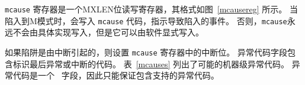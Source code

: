 \iffalse
The {\tt mcause} register is an MXLEN-bit read-write register formatted as
shown in Figure~\ref{mcausereg}.  When a trap is taken into M-mode, {\tt
mcause} is written with a code indicating the event that caused the trap.
Otherwise, {\tt mcause} is never written by the implementation, though it may be
explicitly written by software.

The Interrupt bit in the {\tt mcause} register is set if the
trap was caused by an interrupt. The Exception Code field
 contains a code identifying the last exception or interrupt.  Table~\ref{mcauses}
lists the possible machine-level exception codes.  The Exception Code
is a \wlrl\ field, so is only guaranteed to hold supported exception
codes.
\fi

{\tt mcause} 寄存器是一个MXLEN位读写寄存器，其格式如图~\ref{mcausereg} 所示。 
当陷入到M模式时，会写入 {\tt mcause} 代码，指示导致陷入的事件。 
否则，{\tt mcause}永远不会由具体实现写入，但是它可以由软件显式写入。

如果陷阱是由中断引起的，则设置 {\tt mcause} 寄存器中的中断位。 
异常代码字段包含标识最后异常或中断的代码。 
表~\ref{mcauses} 列出了可能的机器级异常代码。 异常代码是一个 \wlrl\ 字段，因此只能保证包含支持的异常代码。



